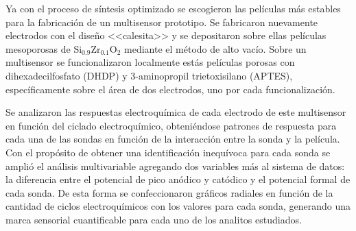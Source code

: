 	Ya con el proceso de síntesis optimizado se escogieron las películas más estables para la fabricación de un multisensor prototipo. Se fabricaron nuevamente electrodos con el diseño <<calesita>> y se depositaron sobre ellas películas mesoporosas de Si$_{0.9}$Zr$_{0.1}$O$_2$ mediante el método de alto vacío. Sobre un multisensor se funcionalizaron localmente estás películas porosas con dihexadecilfosfato (DHDP) y 3-aminopropil trietoxisilano (APTES), específicamente sobre el área de dos electrodos, uno por cada funcionalización.
	
	Se analizaron las respuestas electroquímica de cada electrodo de este multisensor en función del ciclado electroquímico, obteniéndose patrones de respuesta para cada una de las sondas en función de la interacción entre la sonda y la película. Con el propósito de obtener una identificación inequívoca para cada sonda se amplió el análisis multivariable agregando dos variables más al sistema de datos: la diferencia entre el potencial de pico anódico y catódico y el potencial formal de cada sonda. De esta forma se confeccionaron gráficos radiales en función de la cantidad de ciclos electroquímicos con los valores para cada sonda, generando una marca sensorial cuantificable para cada uno de los analitos estudiados.





	